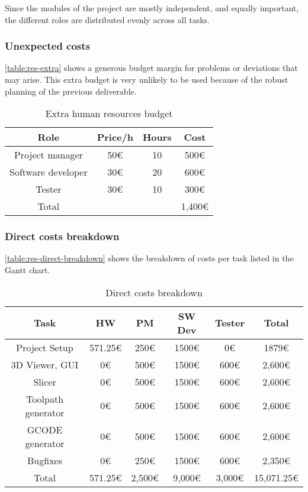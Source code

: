 Since the modules of the project are mostly independent, and equally important, the different roles are distributed evenly across all tasks.

\subsubsection{Unexpected costs}
\autoref{table:res-extra} shows a generous budget margin for problems or deviations that may arise. This extra budget is very unlikely to be used because of the robust planning of the previous deliverable.

\FloatBarrier
\begin{table}[h!]
\centering
\begin{tabular}{ |c|c|c|c| } 
    \hline
    Role & Price/h & Hours & Cost \\
    \hline
    \hline
    Project manager & 50€ & 10 & 500€ \\
    \hline
    Software developer & 30€ & 20 & 600€ \\
    \hline
    Tester & 30€ & 10 & 300€ \\
    \hline
    \hline
    Total & & & 1,400€ \\
    \hline
\end{tabular}
\caption{Extra human resources budget \cite{dev-salary, pm-salary, qa-eng-salary}}\label{table:res-extra}
\end{table}
\FloatBarrier



\subsubsection{Direct costs breakdown}

\autoref{table:res-direct-breakdown} shows the breakdown of costs per task listed in the Gantt chart.



\FloatBarrier
\begin{table}[h!]
\centering
\begin{tabular}{ |c|c|c|c|c|c| } 
    \hline
    Task & HW & PM & SW Dev & Tester & Total \\
    \hline
    \hline
    Project Setup & 571.25€ & 250€ & 1500€ & 0€ & 1879€ \\
    \hline
    3D Viewer, GUI & 0€ & 500€ & 1500€ & 600€ & 2,600€ \\
    \hline
    Slicer & 0€ & 500€ & 1500€ & 600€ & 2,600€ \\
    \hline
    Toolpath generator & 0€ & 500€ & 1500€ & 600€ & 2,600€ \\
    \hline
    GCODE generator & 0€ & 500€ & 1500€ & 600€ & 2,600€ \\
    \hline
    Bugfixes & 0€ & 250€ & 1500€ & 600€ & 2,350€ \\
    \hline
    \hline
    Total & 571.25€ & 2,500€ & 9,000€ & 3,000€ & 15,071.25€ \\
    \hline
\end{tabular}
\caption{Direct costs breakdown}
\label{table:res-direct-breakdown}
\end{table}
\FloatBarrier



